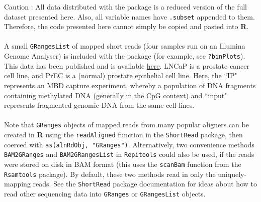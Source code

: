 Caution : All data distributed with the package is a reduced version of the full dataset presented here. Also, all variable names have \texttt{.subset} appended to them. Therefore, the code presented here cannot simply be copied and pasted into \textbf{R}.
\\ \\
A small \texttt{GRangesList} of mapped short reads (four samples run on an Illumina Genome Analyser) is included with the package (for example, see \texttt{?binPlots}). This data has been published and is available \href{http://www.ncbi.nlm.nih.gov/geo/query/acc.cgi?acc=GSE24546}{here}. LNCaP is a prostate cancer cell line, and PrEC is a (normal) prostate epithelial cell line.  Here, the ``IP" represents an MBD capture experiment, whereby a population of DNA fragments containing methylated DNA (generally in the CpG context) and ``input" represents fragmented genomic DNA from the same cell lines.
\\ \\
Note that \texttt{GRanges} objects of mapped reads from many popular aligners can be created in \textbf{R} using the \texttt{readAligned} function in the \texttt{ShortRead} package, then coerced with \texttt{as(alnRdObj, "GRanges")}. Alternatively, two convenience methods \texttt{BAM2GRanges} and \texttt{BAM2GRangesList} in \texttt{Repitools} could also be used, if the reads were stored on disk in BAM format (this uses the \texttt{scanBam} function from the \texttt{Rsamtools} package). By default, these two methods read in only the uniquely-mapping reads. See the \texttt{ShortRead} package documentation for ideas about how to read other sequencing data into \texttt{GRanges} or \texttt{GRangesList} objects.

